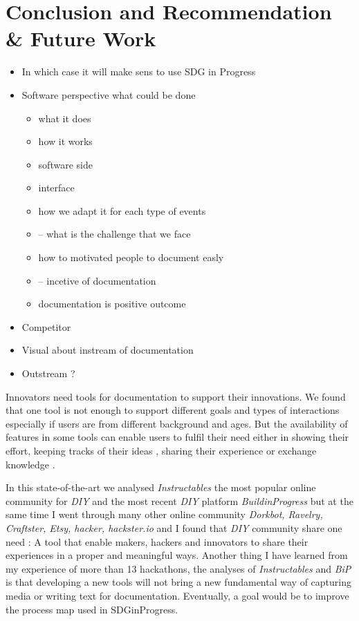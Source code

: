 \chapter{Conclusion and Recommendation \& Future Work}

\begin{itemize}
	\item In which case it will make sens to use SDG in Progress
	\item Software perspective what could be done 
	\begin{itemize}
		\item what it does
		\item how it works
		\item software side
		\item interface
		\item how we adapt it for each type of events
		\item -- what is the challenge that we face 
		\item how to motivated people to document easly
		\item -- incetive of documentation
		\item documentation is positive outcome
	\end{itemize}
	\item Competitor
	\item Visual about instream of documentation
	\item Outstream ?
\end{itemize}


Innovators need tools for documentation to support their innovations. We found that one tool is not enough to support different goals and types of interactions especially if users are from different background and ages. But the availability of features in some tools can enable users to fulfil their need either in showing their effort, keeping tracks of their ideas \cite{Wakkary:2015:TAH:2702123.2702550}, sharing their experience or exchange knowledge \cite{doi:10.1287/orsc.1070.0325}. 

In this state-of-the-art we analysed \textit{Instructables} the most popular online community for \textit{DIY} and the most recent \textit{DIY} platform \textit{BuildinProgress} but at the same time I went through many other online community \textit{Dorkbot, Ravelry, Craftster, Etsy, hacker, hackster.io} and I found that \textit{DIY} community share one need : A tool that enable makers, hackers and innovators to share their experiences in  a proper and meaningful ways.  Another thing I have learned from my experience of more than 13 hackathons, the analyses of \textit{Instructables}  and \textit{BiP} is that developing a new tools will not bring a new fundamental way of capturing media or writing text for documentation. Eventually, a goal would be to improve the process map used in SDGinProgress. 

